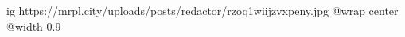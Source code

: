  
 
 
 
 

\ifcmt
  ig https://mrpl.city/uploads/posts/redactor/rzoq1wiijzvxpeny.jpg
  @wrap center
  @width 0.9
\fi
